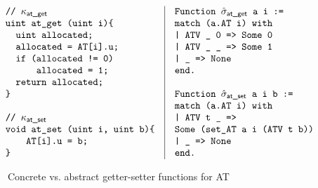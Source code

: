 \begin{figure}[t]\scriptsize
$$
\begin{array}{l|l}
\hspace*{-3ex}
\begin{array}[t]{l}
\verb+// +\kappa_\textsf{at\_get}\\
\verb+uint at_get (uint i){+\\
\verb+  uint allocated;+\\
\verb+  allocated = AT[i].u;+\\
\verb+  if (allocated != 0)+\\
\verb+      allocated = 1;+\\
\verb+  return allocated;+\\
\verb+}+\\
\\
\verb+// +\kappa_\textsf{at\_set}\\
\verb+void at_set (uint i, uint b){+\\
\verb+    AT[i].u = b;+\\
\verb+}+
\end{array}
&
\begin{array}[t]{l}
\verb+Function + \hat{\sigma}_\textsf{at\_get} \verb+ a i :=+\\
\verb+match (a.AT i) with+\\
\verb+| ATV _ 0 => Some 0+\\
\verb+| ATV _ _ => Some 1+\\
\verb+| _ => None+\\
\verb+end.+\\
\\
\verb+Function + \hat{\sigma}_\textsf{at\_set} \verb+ a i b :=+\\
\verb+match (a.AT i) with+\\
\verb+| ATV t _ =>+\\
\verb+Some (set_AT a i (ATV t b))+\\
\verb+| _ => None+\\
\verb+end.+
\end{array}
\end{array}
$$ 
\caption{Concrete vs. abstract getter-setter functions for \textsf{AT}}
\label{fig:alt:gettersetter}
\end{figure}
 
